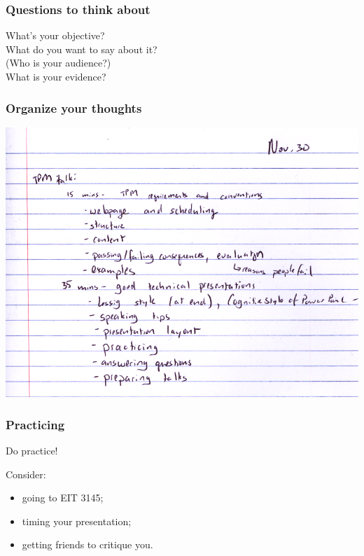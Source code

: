 \documentclass{beamer}
\begin{document}
\begin{frame}

\frametitle{Questions to think about}

What's your objective?\\[1em]

What do you want to say about it?\\[1em]

(Who is your audience?)\\[1em]

What is your evidence?

\end{frame}

\begin{frame}
\frametitle{Organize your thoughts}

\begin{center}
\includegraphics[height=0.8\textheight]{meta-outline}
\end{center}

\end{frame}

\begin{frame}
\frametitle{Practicing}

\begin{center}
Do practice!\\[2em]
\end{center}

Consider:
\begin{itemize}
\item going to EIT 3145;
\item timing your presentation;
\item getting friends to critique you.
\end{itemize}

\end{frame}
\end{document}
